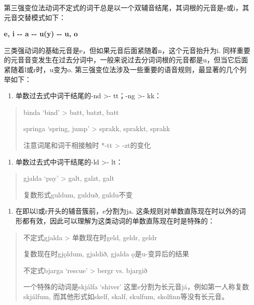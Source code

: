 第三强变位法动词不定式的词干总是以一个双辅音结尾，其词根的元音是e或i，其元音交替模式如下：

\textbf{e, i -\/- a -\/- u(y) -\/- u, o}

三类强动词的基础元音是e，但如果元音后面紧随着n，这个元音抬升为i.
同样重要的元音音变发生在过去分词中，一般来说过去分词词根的元音都是u，但当它后面紧随着l或r时，u变为o.
第三强变位法涉及一些重要的语音规则，最显著的几个列举如下：

\begin{enumerate}
\def\labelenumi{\arabic{enumi})}
\item
  单数过去式中词干结尾的-nd \textgreater- tt；-ng \textgreater- kk：
\end{enumerate}

\begin{quote}
binda `bind‌' \textgreater{} batt, batzt, batt

springa `spring, jump‌' \textgreater{} sprakk, sprakkt, sprakk

注意词尾和词干相接触时 *-tt \textgreater{} -zt的变化
\end{quote}

\begin{enumerate}
\def\labelenumi{\arabic{enumi})}
\setcounter{enumi}{1}
\item
  单数过去式中词干结尾的-ld \textgreater- lt：
\end{enumerate}

\begin{quote}
gjalda `pay‌' \textgreater{} galt, galzt, galt

复数形式guldum, gulduð, guldu不变
\end{quote}

\begin{enumerate}
\def\labelenumi{\arabic{enumi})}
\setcounter{enumi}{2}
\item
  在即以l或r开头的辅音簇前，e分割为ja.
  这条规则对单数直陈现在时以外的词形都有效，因此可以理解为这类动词的单数直陈现在时是特殊的：
\end{enumerate}

\begin{quote}
不定式gjalda \textgreater{} 单数现在时geld, geldr, geldr

复数现在时gjǫldum, gjaldið, gjalda ǫ是u-变异后的结果

不定式bjarga `rescue‌' \textgreater{} bergr vs. bjargið

一个特殊的动词是skjálfa `shiver‌'
这里e分割为长元音já，例如第一人称复数skjálfum, 而其他形式如skelf, skalf,
skulfum, skolfinn等没有长元音。
\end{quote}

